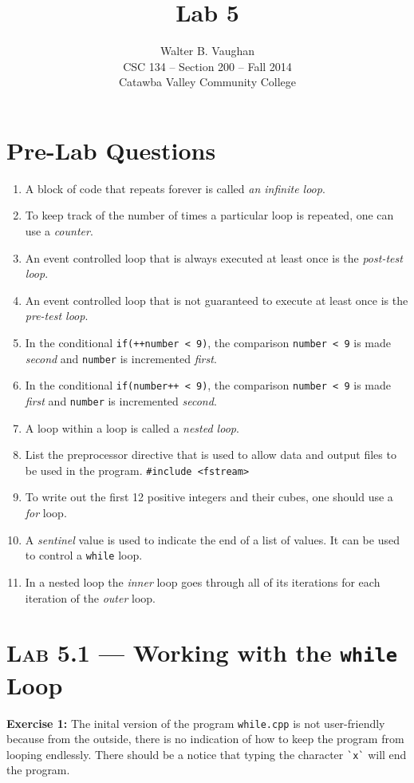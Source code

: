 \documentclass[11pt]{article}
\author{Walter B. Vaughan\\
        \small CSC 134 -- Section 200 -- Fall 2014\\
        \small Catawba Valley Community College}
\title{Lab 5}
\date{\vspace{-5ex}}
\begin{document}
\maketitle

\section*{Pre-Lab Questions}
\begin{enumerate}
	\item A block of code that repeats forever is called \emph{an infinite loop}.
	\item To keep track of the number of times a particular loop is repeated, one
can use a \emph{counter}.
	\item An event controlled loop that is always executed at least once is the \emph{post-test loop}.
	\item An event controlled loop that is not guaranteed to execute at least once is
the \emph{pre-test loop}.
	\item In the conditional \lstinline{if(++number < 9)}, the comparison \lstinline{number < 9} is made \emph{second} and \lstinline{number} is incremented \emph{first}.
	\item In the conditional \lstinline{if(number++ < 9)}, the comparison \lstinline{number < 9} is made \emph{first} and \lstinline{number} is incremented \emph{second}.
	\item A loop within a loop is called a \emph{nested loop}.
	\item List the preprocessor directive that is used to allow data and output files to
be used in the program. \lstinline{#include <fstream>}
	\item To write out the first 12 positive integers and their cubes, one should use
a \emph{for} loop.
	\item A \emph{sentinel} value is used to indicate the end of a list of values. It can be used to control a \lstinline{while} loop.
	\item In a nested loop the \emph{inner} loop goes through all of its iterations for each iteration of the \emph{outer} loop.
\end{enumerate}


\section*{\textsc{Lab 5.1} --- Working with the \texttt{while} Loop}

	\textbf{Exercise 1:} The inital version of the program \texttt{while.cpp} is not user-friendly because from the outside, there is no indication of how to keep the program from looping endlessly. There should be a notice that typing the character \lstinline{`x`} will end the program.
	
\end{document}
